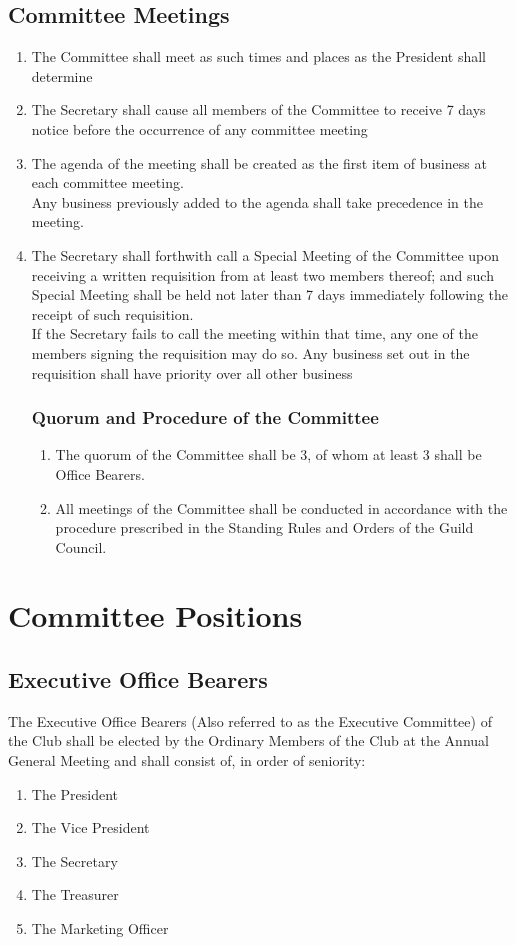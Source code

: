 \documentclass[10pt,a4paper]{report}
\begin{document}
	\section{Committee Meetings}
	\begin{enumerate}[label=\alph*]
		\item The Committee shall meet as such times and places as the President shall determine
		\item The Secretary shall cause all members of the Committee to receive 7 days notice before the occurrence of any committee meeting
		\item The agenda of the meeting shall be created as the first item of business at each committee meeting. \\
		Any business previously added to the agenda shall take precedence in the meeting.
		\item The Secretary shall forthwith call a Special Meeting of the Committee upon receiving a written requisition from at least two members thereof; and such Special Meeting shall be held not later than 7 days immediately following the receipt of such requisition. \\
		If the Secretary fails to call the meeting within that time, any one of the members signing the requisition may do so. Any business set out in the requisition shall have priority over all other business
		\subsection{Quorum and Procedure of the Committee}
		\begin{enumerate}[label=\alph*]
		\item The quorum of the Committee shall be 3, of whom at least 3 shall be Office Bearers.
		\item All meetings of the Committee shall be conducted in accordance with the procedure prescribed in the Standing Rules and Orders of the Guild Council.
		\end{enumerate}
	\end{enumerate}

	\chapter{Committee Positions}
	\section{Executive Office Bearers}
	The Executive Office Bearers (Also referred to as the Executive Committee) of the Club shall be elected by the Ordinary Members of the Club at the Annual General Meeting and shall consist of, in order of seniority:
		\begin{enumerate}[label=\alph*]	
			\item The President
			\item The Vice President
			\item The Secretary
			\item The Treasurer
			\item The Marketing Officer
		\end{enumerate}
\end{document}
